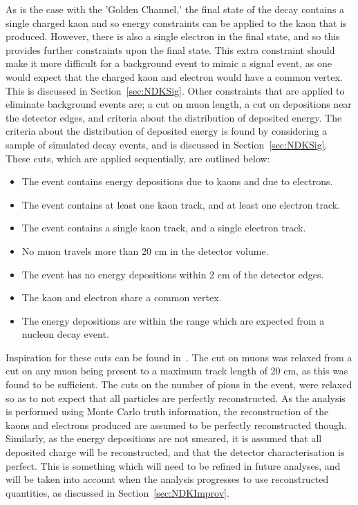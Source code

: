 As is the case with the 'Golden Channel,' the final state of the decay contains a single charged kaon and so energy constraints can be applied to the kaon that is produced. However, there is also a single electron in the final state, and so this provides further constraints upon the final state. This extra constraint should make it more difficult for a background event to mimic a signal event, as one would expect that the charged kaon and electron would have a common vertex. This is discussed in Section~\ref{sec:NDKSig}. Other constraints that are applied to eliminate background events are; a cut on muon length, a cut on depositions near the detector edges, and criteria about the distribution of deposited energy. The criteria about the distribution of deposited energy is found by considering a sample of simulated decay events, and is discussed in Section~\ref{sec:NDKSig}. These cuts, which are applied sequentially, are outlined below:
\begin{itemize}
\item The event contains energy depositions due to kaons and due to electrons.
\item The event contains at least one kaon track, and at least one electron track.
\item The event contains a single kaon track, and a single electron track.
\item No muon travels more than 20 cm in the detector volume.
\item The event has no energy depositions within 2 cm of the detector edges.
\item The kaon and electron share a common vertex.
\item The energy depositions are within the range which are expected from a nucleon decay event.
\end{itemize}
Inspiration for these cuts can be found in~\citep{Bueno}. The cut on muons was relaxed from a cut on any muon being present to a maximum track length of 20 cm, as this was found to be sufficient. The cuts on the number of pions in the event, were relaxed so as to not expect that all particles are perfectly reconstructed. As the analysis is performed using Monte Carlo truth information, the reconstruction of the kaons and electrons produced are assumed to be perfectly reconstructed though. Similarly, as the energy depositions are not smeared, it is assumed that all deposited charge will be reconstructed, and that the detector characterisation is perfect. This is something which will need to be refined in future analyses, and will be taken into account when the analysis progresses to use reconstructed quantities, as discussed in Section~\ref{sec:NDKImprov}. \\ 

